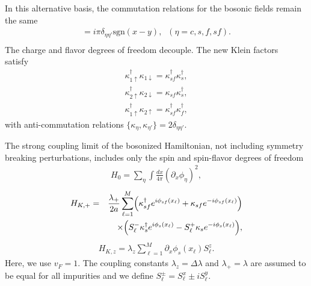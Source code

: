 \documentclass[aps,prb,twocolumn,superscriptaddress]{revtex4-1}
\begin{document}
In this alternative basis, the commutation relations for the bosonic fields remain the same
\begin{eqnarray}
[\phi_{\eta}(x),\phi_{\eta'}(y)]=i\pi\delta_{\eta\eta'}\mathrm{sgn}(x-y),\;\;(\eta=c,s,f,sf). \nonumber \\ \label{eqn:boson_relations_eta}
\end{eqnarray}
The charge and flavor degrees of freedom decouple. The new Klein factors satisfy~\cite{delft1998kondo}
\begin{eqnarray}
\kappa_{1\uparrow}^{\dagger}\kappa_{1\downarrow}=\kappa_{sf}^{\dagger}\kappa_{s}^{\dagger}, \label{eqn:klein_tranformation} \\
\kappa_{2\uparrow}^{\dagger}\kappa_{2\downarrow}=\kappa_{sf}\kappa_{s}^{\dagger}, \\
\kappa_{1\uparrow}^{\dagger}\kappa_{2\uparrow}=\kappa_{sf}^{\dagger}\kappa_{f}^{\dagger},
\end{eqnarray}
with anti-commutation relations $\{\kappa_{\eta},\kappa_{\eta'}\}=2\delta_{\eta\eta'}$. 

The strong coupling limit of the bosonized Hamiltonian, not including symmetry breaking perturbations, includes only the spin and spin-flavor degrees of freedom
\begin{eqnarray}
H_{0}=\sum_{\eta}\int\frac{dx}{4\pi}(\partial_{x}\phi_{\eta})^{2}, \label{eqn:H_bosonized_0}
\end{eqnarray}
\begin{eqnarray}
H_{K,+}=&&\frac{\lambda_{+}}{2a}\sum_{\ell=1}^{M}\Bigl(\kappa_{sf}^{\dagger}e^{i\phi_{sf}(x_{\ell})}+\kappa_{sf}e^{-i\phi_{sf}(x_{\ell})}\Bigr) \nonumber \\ 
&&\times\Bigl(S_{\ell}^{-}\kappa_{s}^{\dagger}e^{i\phi_{s}(x_{\ell})}-S_{\ell}^{+}\kappa_{s}e^{-i\phi_{s}(x_{\ell})}\Bigr),  \label{eqn:H_bosonized_Kplus}
\end{eqnarray}
\begin{eqnarray}
H_{K,z}=\lambda_{z}\sum_{\ell=1}^{M}\partial_{x}\phi_{s}(x_{\ell})S_{\ell}^{z}. \label{eqn:H_bosonized_Kz}
\end{eqnarray}
Here, we use $v_{F}=1$. The coupling constants $\lambda_{z}=\Delta{\lambda}$ and $\lambda_{+}=\lambda$ are assumed to be equal for all impurities and we define $S_{\ell}^{\pm}=S_{\ell}^{x}\pm iS_{\ell}^{y}$. 
\end{document}
